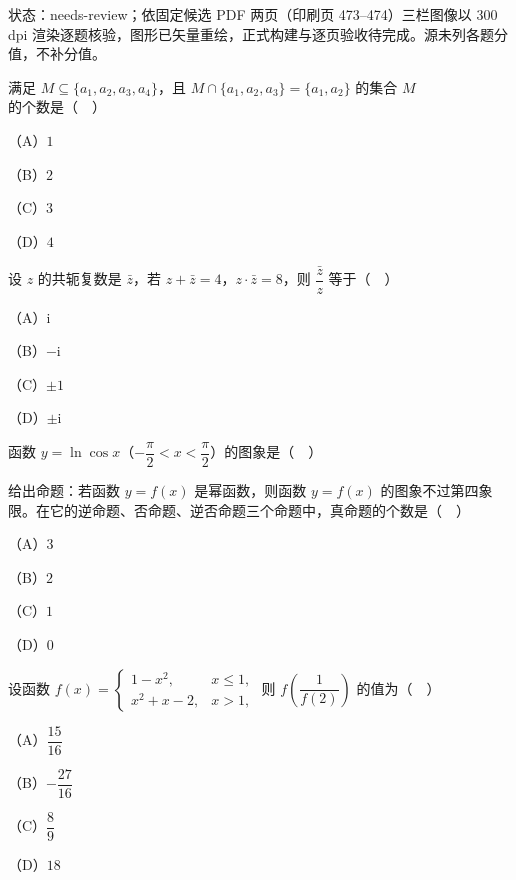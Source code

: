 

状态：needs-review；依固定候选 PDF 两页（印刷页 473–474）三栏图像以 300 dpi 渲染逐题核验，图形已矢量重绘，正式构建与逐页验收待完成。源未列各题分值，不补分值。


\begin{question}
满足 $M\subseteq\{a_1,a_2,a_3,a_4\}$，且 $M\cap\{a_1,a_2,a_3\}=\{a_1,a_2\}$ 的集合 $M$ 的个数是（　）

（A）$1$

（B）$2$

（C）$3$

（D）$4$

\end{question}
\begin{question}
设 $z$ 的共轭复数是 $\bar z$，若 $z+\bar z=4$，$z\cdot\bar z=8$，则 $\dfrac{\bar z}{z}$ 等于（　）

（A）$\mathrm i$

（B）$-\mathrm i$

（C）$\pm1$

（D）$\pm\mathrm i$

\Needspace{0.4\textheight}
\end{question}
\begingroup
\renewenvironment{question}{\Needspace{0.42\textheight}}{}
\begin{question}
函数 $y=\ln\cos x$（$-\dfrac{\pi}{2}<x<\dfrac{\pi}{2}$）的图象是（　）
\nopagebreak[4]
\begin{center}\end{center}
\nopagebreak[4]
\end{question}
\endgroup
\begin{question}
给出命题：若函数 $y=f(x)$ 是幂函数，则函数 $y=f(x)$ 的图象不过第四象限。在它的逆命题、否命题、逆否命题三个命题中，真命题的个数是（　）

（A）$3$

（B）$2$

（C）$1$

（D）$0$

\end{question}
\begin{question}
设函数 $f(x)=\begin{cases}1-x^2,&x\leqslant1,\\ x^2+x-2,&x>1,\end{cases}$ 则 $f\left(\dfrac1{f(2)}\right)$ 的值为（　）

（A）$\dfrac{15}{16}$

（B）$-\dfrac{27}{16}$

（C）$\dfrac89$

（D）$18$

\Needspace{0.4\textheight}
\end{question}
